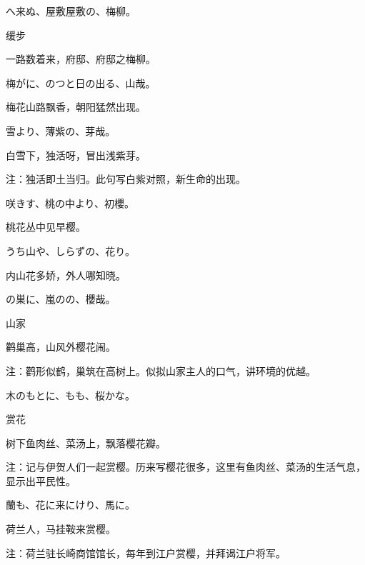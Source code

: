 \begin{haiku}
    {\FH {}へ来ぬ、屋敷屋敷の、梅柳。}

    {\FK 缓步}

    {\FK 一路数着来，府邸、府邸之梅柳。}
\end{haiku}

\begin{haiku}
    {\FH 梅がに、のつと日の出る、山哉。}

    {\FK 梅花山路飘香，朝阳猛然出现。}
\end{haiku}

\begin{haiku}
    {\FH 雪より、薄紫の、芽哉。}

    {\FK 白雪下，独活呀，冒出浅紫芽。}

    {\FT 注：独活即土当归。此句写白紫对照，新生命的出现。}
\end{haiku}

\begin{haiku}
    {\FH 咲きす、桃の中より、初櫻。}

    {\FK 桃花丛中见早樱。}
\end{haiku}

\begin{haiku}
    {\FH うち山や、しらずの、花り。}

    {\FK 内山花多娇，外人哪知晓。}
\end{haiku}

\begin{haiku}
    {\FH {}の巣に、嵐のの、櫻哉。}

    {\FK 山家}

    {\FK 鹳巢高，山风外樱花闹。}

    {\FT 注：鹳形似鹤，巢筑在高树上。似拟山家主人的口气，讲环境的优越。}
\end{haiku}

\begin{haiku}
    {\FH 木のもとに、もも、桜かな。}

    {\FK 赏花}

    {\FK 树下鱼肉丝、菜汤上，飘落樱花瓣。}

    {\FT 注：记与伊贺人们一起赏樱。历来写樱花很多，这里有鱼肉丝、菜汤的生活气息，显示出平民性。}
\end{haiku}

\begin{haiku}
    {\FH {}蘭も、花に来にけり、馬に。}

    {\FK 荷兰人，马挂鞍来赏樱。}

    {\FT 注：荷兰驻长崎商馆馆长，每年到江户赏樱，并拜谒江户将军。}
\end{haiku}


